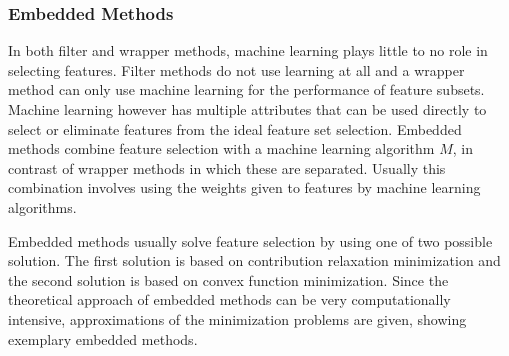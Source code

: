 \documentclass[10pt,a4paper]{article}
\begin{document}
	\subsubsection{Embedded Methods}
	\label{subsec:EmbeddedMethods}
	
	In both filter and wrapper methods, machine learning plays little to no role in selecting features. Filter methods do not use learning at all and a wrapper method can only use machine learning for the performance of feature subsets. Machine learning however has multiple attributes that can be used directly to select or eliminate features from the ideal feature set selection. Embedded methods combine feature selection with a machine learning algorithm $M$, in contrast of wrapper methods in which these are separated\cite{Lal2006}. Usually this combination involves using the weights given to features by machine learning algorithms\cite{blum1997selection}.
	
	Embedded methods usually solve feature selection by using one of two possible solution. The first solution is based on contribution relaxation minimization and the second solution is based on convex function minimization. Since the theoretical approach of embedded methods can be very computationally intensive, approximations of the minimization problems are given, showing exemplary embedded methods\cite{Lal2006}.
	
\end{document}
